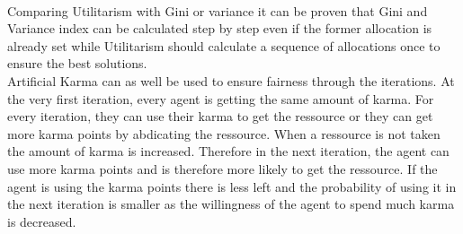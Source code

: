 \documentclass[german, a4paper, 11pt, oneside]{scrbook}
\begin{document}
\\
Comparing Utilitarism with Gini or variance it can be proven that Gini and Variance index can be calculated step by step even if the former allocation is already set while Utilitarism should calculate a sequence of allocations once to ensure the best solutions.
\\Artificial Karma can as well be used to ensure fairness through the iterations. At the very first iteration, every agent is getting the same amount of karma. For every iteration, they can use their karma to get the ressource or they can get more karma points by abdicating the ressource. When a ressource is not taken the amount of karma is increased. Therefore in the next iteration, the agent can use more karma points and is therefore more likely to get the ressource. If the agent is using the karma points there is less left and the probability of using it in the next iteration is smaller as the willingness of the agent to spend much karma is decreased.
\end{document}

